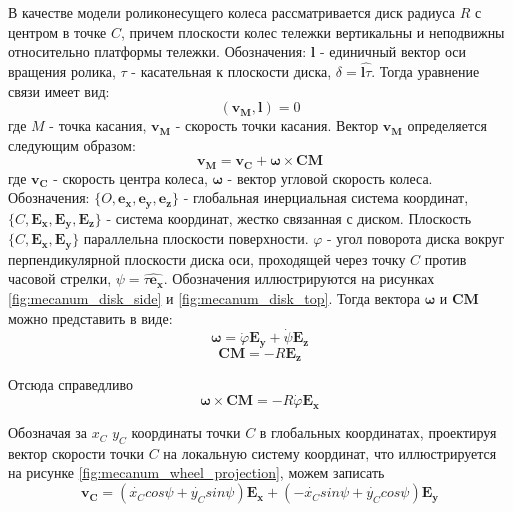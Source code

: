 \documentclass[oneside,final,14pt]{extreport}
\newcommand{\bs}{\boldsymbol}
\begin{document}
 В качестве модели роликонесущего колеса рассматривается диск радиуса $R$ с центром в точке $C$, причем плоскости колес тележки вертикальны и неподвижны относительно платформы тележки. Обозначения: $\bs{l}$ - единичный вектор оси вращения ролика, $\tau$ - касательная к плоскости диска, $\delta = \widehat{\bs{l} \tau}$. Тогда уравнение связи имеет вид:
\begin{equation}
(
\bs{v_{M}}
,
\bs{l}
)
=
0
\end{equation}
где $M$ - точка касания, $\bs{v_{M}}$ - скорость точки касания. Вектор $\bs{v_{M}}$ определяется следующим образом:
\begin{equation}
\bs{v_{M}}
=
\bs{v_{C}}
+
\bs{\omega}
\times
\bs{CM}
\end{equation}
где
$\bs{v_{C}}$ -   
скорость центра колеса, $\bs{\omega}$ - вектор угловой скорость колеса.
Обозначения: $\{O,\bs{e_{x}},\bs{e_{y}},\bs{e_{z}}\}$ - глобальная инерциальная система координат, $\{C,\bs{E_{x}},\bs{E_{y}},\bs{E_{z}}\}$ - система координат, жестко связанная с диском. Плоскость $\{C,\bs{E_{x}},\bs{E_{y}}\}$ параллельна плоскости поверхности.  $\varphi$ - угол поворота диска вокруг перпендикулярной плоскости диска оси, проходящей через точку $C$ против часовой стрелки, $\psi = \widehat{\tau \bs{e_{x}}}$. Обозначения иллюстрируются на рисунках \ref{fig:mecanum_disk_side} и \ref{fig:mecanum_disk_top}. Тогда вектора $\bs{\omega}$ и $\bs{CM}$ можно представить в виде:
\begin{equation}
\bs{\omega}
=
\dot{\varphi}
\bs{E_{y}}
+
\dot{\psi}
\bs{E_{z}}
\end{equation}
\begin{equation}
\bs{CM}
=
-R
\bs{E_{z}}
\end{equation}

Отсюда справедливо
\begin{equation}
\bs{\omega}
\times
\bs{CM}
=
-R\dot{\varphi}
\bs{E_{x}}
\end{equation} 

Обозначая за $x_{C}$ $y_{C}$ координаты точки $C$ в глобальных координатах, проектируя вектор скорости точки $C$ на локальную систему координат, что иллюстрируется на рисунке \ref{fig:mecanum_wheel_projection}, можем записать
\begin{equation}
\label{eq:velocity_c_projection}
\bs{v_{C}}
=
(
\dot{x_{C}}
cos\psi
+
\dot{y_{C}}
sin\psi
)
\bs{E_{x}}
+
(
-\dot{x_{C}}
sin\psi
+
\dot{y_{C}}
cos\psi
)
\bs{E_{y}}
\end{equation}

\begin{figure}[H]
\end{figure}
\end{document}
